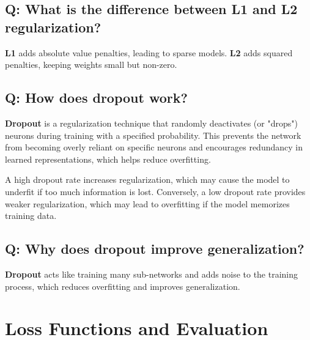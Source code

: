 \documentclass[11pt]{article}
\begin{document}
\subsection*{Q: What is the difference between L1 and L2 regularization?}
\textbf{L1} adds absolute value penalties, leading to sparse models. \textbf{L2} adds squared penalties, keeping weights small but non-zero.

\subsection*{Q: How does dropout work?}
\textbf{Dropout} is a regularization technique that randomly deactivates (or "drops") neurons during training with a specified probability. This prevents the network from becoming overly reliant on specific neurons and encourages redundancy in learned representations, which helps reduce overfitting.

A high dropout rate increases regularization, which may cause the model to underfit if too much information is lost. Conversely, a low dropout rate provides weaker regularization, which may lead to overfitting if the model memorizes training data.

\subsection*{Q: Why does dropout improve generalization?}
\textbf{Dropout} acts like training many sub-networks and adds noise to the training process, which reduces overfitting and improves generalization.

\section{Loss Functions and Evaluation}
\end{document}
